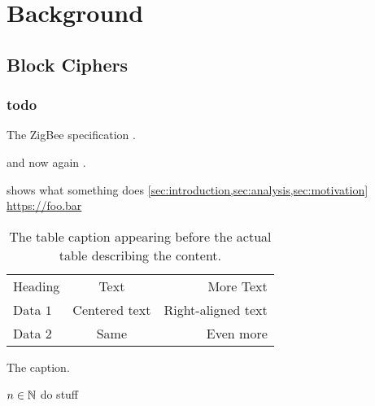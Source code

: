 
\chapter{Background}  \label{sec:background}

\section{Block Ciphers}  \label{sec:block-ciphers}

\subsection{todo}  \label{sec:aes}

The ZigBee specification \cite{ieee-802-15-4}.

and now again .

 shows what something does \cref{sec:introduction,sec:analysis,sec:motivation}
\url{https://foo.bar}


\begin{table}
  \caption[A shorter caption for the List of Tables]{The table caption appearing before the actual table describing the content.}%
  \label{tab:info}%
  \centering
  \begin{tabular}{l c r}
    \toprule
    Heading  & Text          & More Text \\
    \cmidrule{0-1}
    Data $1$ & Centered text & Right-aligned text \\
    \midrule
    Data $2$ & Same          & Even more \\
    \bottomrule
  \end{tabular}
\end{table}

\begin{algorithm}
  \caption{The caption.}%
  \label{alg:stuff}
  {
    $n \in \mathbb{N}$ \;
    do stuff \;
  }
\end{algorithm}

\Blindtext

\Blindtext